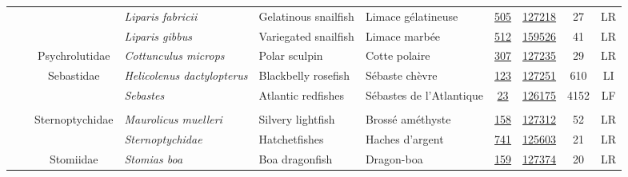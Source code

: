 \documentclass[12pt]{article}\usepackage[]{graphicx}\usepackage[]{color}
\begin{document}
\begin{landscapepage}
\begin{longtable}[t]{ccc>{\centering\arraybackslash}p{3cm}>{\centering\arraybackslash}p{3cm}>{\centering\arraybackslash}p{3cm}>{}c>{}ccc}
\hspace{1em}\hspace{1em} &  &  & \em{Liparis fabricii} & Gelatinous snailfish & Limace gélatineuse & \href{#sec:712}{505} & \href{http://www.marinespecies.org/aphia.php?p=taxdetails&id=126352}{127218} & 27 & LR\\
\hspace{1em}\hspace{1em} &  &  & \em{Liparis gibbus} & Variegated snailfish & Limace marbée & \href{#sec:150}{512} & \href{http://www.marinespecies.org/aphia.php?p=taxdetails&id=125498}{159526} & 41 & LR\\
\hspace{1em}\hspace{1em} &  & Psychrolutidae & \em{Cottunculus microps} & Polar sculpin & Cotte polaire & \href{#sec:158}{307} & \href{http://www.marinespecies.org/aphia.php?p=taxdetails&id=127312}{127235} & 29 & LR\\
\hspace{1em}\hspace{1em} &  & Sebastidae & \em{Helicolenus dactylopterus} & Blackbelly rosefish & Sébaste chèvre & \href{#sec:159}{123} & \href{http://www.marinespecies.org/aphia.php?p=taxdetails&id=127374}{127251} & 610 & LI\\
\hspace{1em}\hspace{1em} &  &  & \em{Sebastes} & Atlantic redfishes & Sébastes de l'Atlantique & \href{#sec:741}{23} & \href{http://www.marinespecies.org/aphia.php?p=taxdetails&id=125603}{126175} & 4152 & LF\\
\addlinespace[0.3em]
\\
\hspace{1em}\hspace{1em} &  & Sternoptychidae & \em{Maurolicus muelleri} & Silvery lightfish & Brossé améthyste & \href{#sec:160}{158} & \href{http://www.marinespecies.org/aphia.php?p=taxdetails&id=126715}{127312} & 52 & LR\\
\hspace{1em}\hspace{1em} &  &  & \em{Sternoptychidae} & Hatchetfishes & Haches d'argent & \href{#sec:400}{741} & \href{http://www.marinespecies.org/aphia.php?p=taxdetails&id=159184}{125603} & 21 & LR\\
\hspace{1em}\hspace{1em} &  & Stomiidae & \em{Stomias boa} & Boa dragonfish & Dragon-boa & \href{#sec:742}{159} & \href{http://www.marinespecies.org/aphia.php?p=taxdetails&id=126558}{127374} & 20 & LR\\

\end{longtable}
\end{landscapepage}
\end{document}
